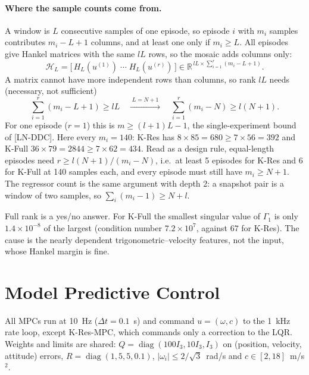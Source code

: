 \documentclass[11pt,a4paper]{article}
\newcommand{\KRes}{\textsf{K-Res}}            %
\newcommand{\KFull}{\textsf{K-Full}}          %
\newcommand{\KResMPC}{\textsf{K-Res-MPC}}     %
\newcommand{\diag}{\operatorname{diag}}
\begin{document}
	\paragraph{Where the sample counts come from.}
	A window is $L$ consecutive samples of one episode, so episode $i$ with $m_i$ samples contributes
	$m_i - L + 1$ columns, and at least one only if $m_i \ge L$. All episodes give Hankel matrices with
	the same $lL$ rows, so the mosaic adds columns only:
	\begin{equation}
		\mathcal{H}_L = \bigl[\,H_L(u^{(1)}) \;\cdots\; H_L(u^{(r)})\,\bigr]
		\in \mathbb{R}^{\,lL \times \sum_{i=1}^{r} (m_i - L + 1)} .
	\end{equation}
	A matrix cannot have more independent rows than columns, so rank $lL$ needs (necessary, not
	sufficient)
	\begin{equation}
		\sum_{i=1}^{r} (m_i - L + 1) \ge lL
		\quad\xrightarrow{\;L = N+1\;}\quad
		\sum_{i=1}^{r} (m_i - N) \ge l(N+1).
		\label{eqn:mosaic-count}
	\end{equation}
	For one episode ($r = 1$) this is $m \ge (l+1)L - 1$, the single-experiment bound of [LN-DDC].
	Here every $m_i = 140$: \KRes{} has $8 \times 85 = 680 \ge 7 \times 56 = 392$ and \KFull{}
	$36 \times 79 = 2844 \ge 7 \times 62 = 434$. Read as a design rule, equal-length episodes need
	$r \ge l(N+1)/(m_i - N)$, i.e.\ at least 5 episodes for \KRes{} and 6 for \KFull{} at 140 samples
	each, and every episode must still have $m_i \ge N + 1$. The regressor count is the same argument
	with depth 2: a snapshot pair is a window of two samples, so $\sum_i (m_i - 1) \ge N + l$.

	Full rank is a yes/no answer. For \KFull{} the smallest singular value of $\Gamma_1$ is only
	$1.4\times10^{-8}$ of the largest (condition number $7.2\times10^{7}$, against $67$ for \KRes{}).
	The cause is the nearly dependent trigonometric--velocity features, not the input, whose Hankel
	margin is fine.
	
	\section{Model Predictive Control}
	\label{sec:mpc}

	All MPCs run at 10~Hz ($\Delta t = 0.1$~s) and command $u = (\omega, c)$ to the 1~kHz rate loop,
	except \KResMPC{}, which commands only a correction to the LQR. Weights and limits are shared:
	$Q = \diag(100 I_3, 10 I_3, I_3)$ on (position, velocity, attitude) errors,
	$R = \diag(1, 5, 5, 0.1)$, $|\omega_i| \le 2/\sqrt{3}$~rad/s and $c \in [2, 18]$~m/s$^2$.
\end{document}
